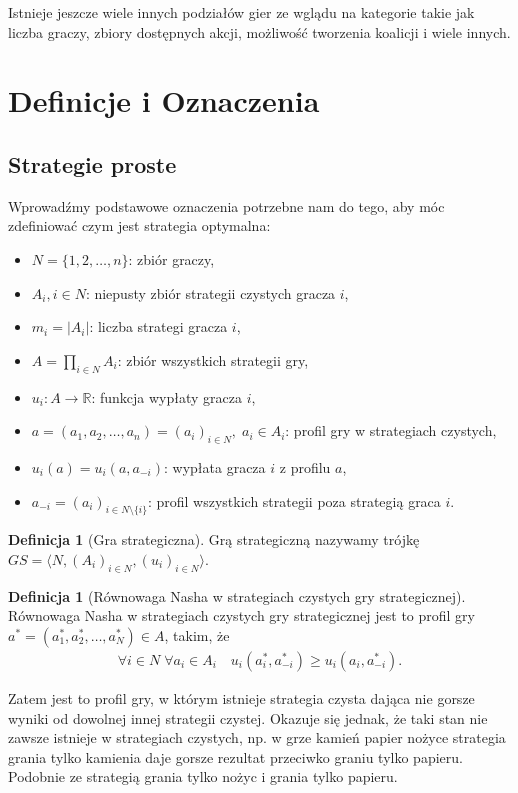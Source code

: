 \documentclass[inzynierska]{pwr_wmat_praca_dyplomowa}
\theoremstyle{plain}
\numberwithin{theorem}{chapter}
\theoremstyle{definition}
\numberwithin{theorem}{chapter}
\newtheorem{definition}[theorem]{Definicja}
\begin{document}
Istnieje jeszcze wiele innych podziałów gier ze wglądu na kategorie takie jak liczba graczy, zbiory dostępnych akcji, możliwość tworzenia koalicji i wiele innych.

\section{Definicje i Oznaczenia}
\subsection{Strategie proste}
Wprowadźmy podstawowe oznaczenia potrzebne nam do tego, aby móc zdefiniować czym jest strategia optymalna:
\begin{itemize}
	\item $ N = \{1, 2, \dots, n\} $: zbiór graczy,
	\item $A_i, i \in N $: niepusty zbiór strategii  czystych gracza $i$,
	\item $m_i = |A_i|$: liczba strategi gracza $i$,
	\item $A = \prod_{i \in N} A_i$: zbiór wszystkich strategii gry, 
	\item $u_i : A \rightarrow \mathbb{R} $: funkcja wypłaty gracza $i$,
	\item $a=(a_1, a_2, \dots, a_n)=(a_i)_{i \in N},\; a_i \in A_i$: profil gry w strategiach czystych,
	\item $u_i(a) = u_i(a, a_{-i})$: wypłata gracza $i$ z profilu $a$,
	\item $a_{-i} = (a_i)_{i\in N \setminus \{i\}}$: profil wszystkich strategii poza strategią graca $i$.
\end{itemize}
	\begin{definition}[Gra strategiczna]
		Grą strategiczną nazywamy trójkę $GS = \langle N,  (A_i)_{i \in N}, (u_i)_{i \in N} \rangle $.
	\end{definition}
	
	\begin{definition}[Równowaga Nasha w strategiach czystych gry strategicznej]
		Równowaga Nasha w strategiach czystych gry strategicznej jest to profil gry $a^*= (a_1^*, a_2^*, \dots, a_N^*)\in A$, takim, że
		\begin{align*}
			\mathop{\forall}{i \in N}\;
			\mathop{\forall}{a_i \in A_i} \quad
			u_i(a_i^*, a_{-i}^*) \ge u_i(a_i, a_{-i}^*).
		\end{align*}
	\end{definition}
	Zatem jest to profil gry, w którym istnieje strategia czysta dająca nie gorsze wyniki od dowolnej innej strategii czystej.
	Okazuje się jednak, że taki stan nie zawsze istnieje w strategiach czystych, np. w grze kamień papier nożyce strategia grania tylko kamienia daje gorsze rezultat przeciwko graniu tylko papieru. Podobnie ze strategią grania tylko nożyc i grania tylko papieru.
\end{document}
